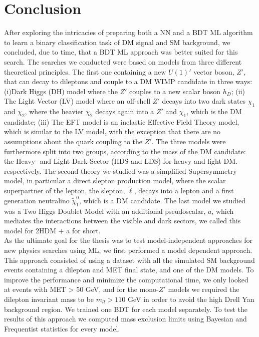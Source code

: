 \documentclass[12pt, a4paper]{book}
\begin{document}
\section{Conclusion}
After exploring the intricacies of preparing both a NN and a BDT ML algorithm to learn a binary classification task of DM signal and SM background, we concluded, due to time, that a BDT ML approach was 
better suited for this search. The searches we conducted were based on models from three different theoretical principles. The first one containing a new $U(1)'$ vector boson, $Z'$, that can decay to dileptons and couple to a DM WIMP candidate in three ways: 
(i)Dark Higgs (DH) model where the $Z'$ couples to a new scalar boson $h_D$; (ii) The Light Vector (LV) model where an off-shell $Z'$ decays into two dark states $\chi_1$ and $\chi_2$, where the heavier $\chi_2$ decays again into a $Z'$ and $\chi_1$, which is the DM candidate;
(iii) The EFT model is an inelastic Effective Field Theory model, which is similar to the LV model, with the exception that there are no assumptions about the quark coupling to the $Z'$. The three models were furthermore 
split into two groups, according to the mass of the DM candidate: the Heavy- and Light Dark Sector (HDS and LDS) for heavy and light DM. respectively. The second theory we studied was a simplified Supersymmetry model, 
in particular a direct slepton production model, where the scalar superpartner of the lepton, the slepton, $\tilde{\ell}$, decays into a lepton and a first generation neutralino $\tilde{\chi}_1^0$, which is a DM candidate. The last model we studied was 
a Two Higgs Doublet Model with an additional pseudoscalar, $a$, which mediates the interactions between the visible and dark sectors, we called this model for 2HDM + a for short.\\
\newpage\noindent As the ultimate goal for the thesis was to test model-independent approaches for new physics searches using ML, we first performed a model dependent approach. This approach consisted of using a dataset 
with all the simulated SM background events containing a dilepton and MET final state, and one of the DM models. To improve the performance and minimize the computational time, we only looked at events with MET > 50 GeV, and for the mono-$Z'$ models we required the dilepton
invariant mass to be $m_{ll}>110$ GeV in order to avoid the high Drell Yan background region. We trained one BDT for each model separately. To test the results of this approach we computed mass exclusion limits using Bayesian and Frequentist statistics for every model.\\
\end{document}
